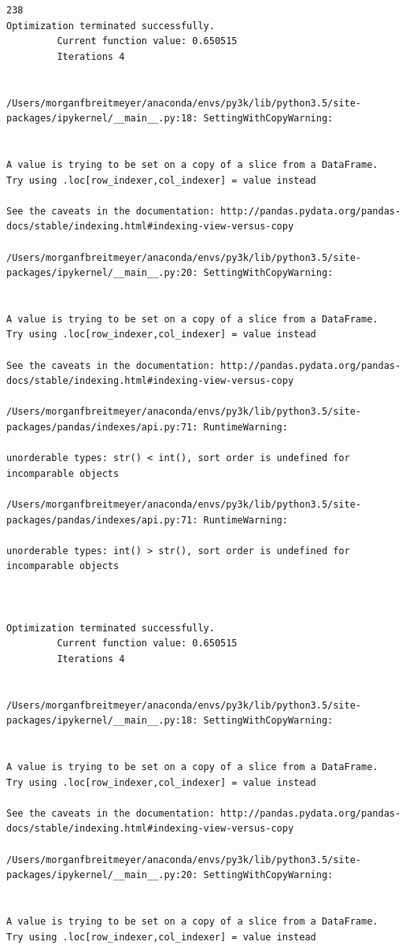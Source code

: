 \begin{lstlisting}
238
Optimization terminated successfully.
         Current function value: 0.650515
         Iterations 4


/Users/morganfbreitmeyer/anaconda/envs/py3k/lib/python3.5/site-packages/ipykernel/__main__.py:18: SettingWithCopyWarning:


A value is trying to be set on a copy of a slice from a DataFrame.
Try using .loc[row_indexer,col_indexer] = value instead

See the caveats in the documentation: http://pandas.pydata.org/pandas-docs/stable/indexing.html#indexing-view-versus-copy

/Users/morganfbreitmeyer/anaconda/envs/py3k/lib/python3.5/site-packages/ipykernel/__main__.py:20: SettingWithCopyWarning:


A value is trying to be set on a copy of a slice from a DataFrame.
Try using .loc[row_indexer,col_indexer] = value instead

See the caveats in the documentation: http://pandas.pydata.org/pandas-docs/stable/indexing.html#indexing-view-versus-copy

/Users/morganfbreitmeyer/anaconda/envs/py3k/lib/python3.5/site-packages/pandas/indexes/api.py:71: RuntimeWarning:

unorderable types: str() < int(), sort order is undefined for incomparable objects

/Users/morganfbreitmeyer/anaconda/envs/py3k/lib/python3.5/site-packages/pandas/indexes/api.py:71: RuntimeWarning:

unorderable types: int() > str(), sort order is undefined for incomparable objects



Optimization terminated successfully.
         Current function value: 0.650515
         Iterations 4


/Users/morganfbreitmeyer/anaconda/envs/py3k/lib/python3.5/site-packages/ipykernel/__main__.py:18: SettingWithCopyWarning:


A value is trying to be set on a copy of a slice from a DataFrame.
Try using .loc[row_indexer,col_indexer] = value instead

See the caveats in the documentation: http://pandas.pydata.org/pandas-docs/stable/indexing.html#indexing-view-versus-copy

/Users/morganfbreitmeyer/anaconda/envs/py3k/lib/python3.5/site-packages/ipykernel/__main__.py:20: SettingWithCopyWarning:


A value is trying to be set on a copy of a slice from a DataFrame.
Try using .loc[row_indexer,col_indexer] = value instead


\end{lstlisting}
